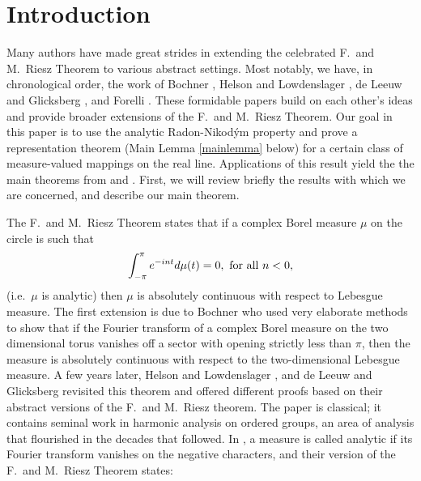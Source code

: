 
\section{Introduction}
\newtheorem{weakmble}{Definition}[section]
\newtheorem{weakanalytic}[weakmble]{Definition}
\newtheorem{hypA}[weakmble]{Definition}
\newtheorem{ex1}[weakmble]{Example}
\newtheorem{ex2}[weakmble]{Example}
\newtheorem{ex3}[weakmble]{Example}
\newtheorem{prop5.2}[weakmble]{Proposition}
\newtheorem{cor5.3}[weakmble]{Corollary}
\newtheorem{prop5.5}[weakmble]{Proposition}
\newtheorem{cor5.7}[weakmble]{Proposition}
%
%
  Many authors have made
 great strides in extending the celebrated 
F.\ and M.\ Riesz Theorem 
to various abstract settings. 
 Most notably, we have, in chronological order,
the work of Bochner \cite{bochner}, 
Helson and Lowdenslager \cite{hl1}, 
de Leeuw and Glicksberg \cite{dg}, and Forelli
\cite{forelli}.  
These formidable papers build on each other's ideas
and provide broader extensions of the F.\ and M.\ Riesz Theorem.
Our goal in this paper is to  use the
analytic Radon-Nikod\'ym property and prove a representation 
theorem (Main Lemma \ref{mainlemma} below) 
for a certain class of
measure-valued mappings on the real line.
Applications of this result yield the  
the main theorems from \cite{dg} 
and \cite{forelli}.  First, we will review briefly the results
with which we are concerned, and describe our main
theorem.

The F.\ and M.\ Riesz Theorem states that if
a complex Borel measure $\mu$ on the circle is such that
$$\int_{-\pi}^\pi e^{- in t} d\mu(t)=0,\ {\rm for\ all}\ n<0,$$
(i.e.\ $\mu$ is analytic)
then $\mu$ is absolutely continuous with respect 
to Lebesgue measure.  The first extension  
is due to Bochner \cite{bochner} who 
used very elaborate methods to show
that if the Fourier transform of a complex Borel measure 
on the two dimensional
torus vanishes off a sector with opening strictly less than
 $\pi$, then the measure is absolutely continuous
 with respect to the two-dimensional Lebesgue measure.
A few years later, Helson and 
Lowdenslager \cite{hl1}, and de Leeuw and Glicksberg 
\cite{dg} revisited this theorem and offered
different proofs based on their abstract versions
of the F.\ and M.\ Riesz theorem.  
The paper \cite{hl1} is
classical; it contains seminal work in 
harmonic analysis on ordered groups, an  area
of analysis that flourished in the decades that
followed. 
In \cite{hl1}, a measure is called
analytic if its Fourier transform vanishes on the negative
characters, and their version of the F.\ and M.\
Riesz Theorem states:

